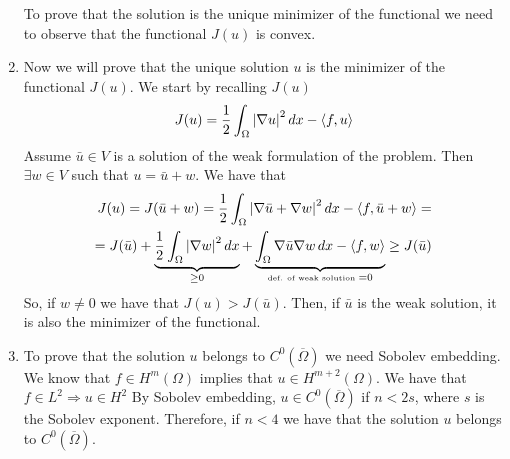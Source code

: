 \begin{enumerate}
    To prove that the solution is the unique minimizer of the functional we need to observe that the functional \(J(u)\) is convex.
    \item Now we will prove that the unique solution \(u\) is the minimizer of the functional \(J(u)\). We start by recalling \(J(u)\)
    \[
        J(u) = \frac{1}{2} \int_\Omega \abs{\nabla u}^2 \, dx - \langle f, u \rangle
    \]
    Assume \(\bar{u} \in V\) is a solution of the weak formulation of the problem. Then \(\exists w \in V\) such that \(u = \bar{u} + w\). We have that
    \[
        \begin{split}
            J(u) = J(\bar{u} + w) = \frac{1}{2} \int_\Omega \abs{\nabla \bar{u} + \nabla w}^2 \, dx - \langle f, \bar{u} + w \rangle = \\
            =J(\bar{u}) + \underbrace{\frac{1}{2}\int_\Omega \abs{\nabla w}^2 \, dx}_{\geq 0} + \underbrace{\int_\Omega \nabla \bar{u} \nabla w \, dx - \langle f, w \rangle}_{\text{\tiny def. of weak solution } = 0} \geq J(\bar{u})
        \end{split}
    \]
    So, if \(w \neq 0\) we have that \(J(u) > J(\bar{u})\). Then, if \(\bar{u}\) is the weak solution, it is also the minimizer of the functional.
    \item To prove that the solution \(u\) belongs to \(C^0(\overline{\Omega})\) we need Sobolev embedding. We know that \(f \in H^m(\Omega)\) implies that \(u \in H^{m+2}(\Omega)\). We have that \(f \in L^2 \Rightarrow u \in H^2\) By Sobolev embedding, \(u \in C^0(\overline{\Omega})\) if \(n < 2s\), where \(s\) is the Sobolev exponent. Therefore, if \(n < 4\) we have that the solution \(u\) belongs to \(C^0(\overline{\Omega})\).
\end{enumerate}

\newpage
